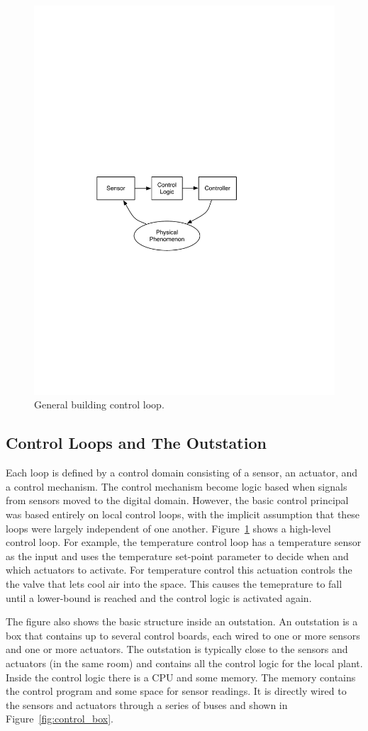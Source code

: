 \begin{figure}[t!] %
\centering
\includegraphics[width=0.50\columnwidth]{figs/control_loop}
\caption{General building control loop.}
\label{fig:control_loop}
\end{figure}

\subsection{Control Loops and The Outstation}
\label{sec:control_loops}
Each loop is defined by a control domain consisting of a sensor, an actuator, and a control mechanism.  The control mechanism
become logic based when signals from sensors moved to the digital domain.  However, the basic control principal was based
entirely on local control loops, with the implicit assumption that these loops were largely independent of one another.
Figure~\ref{fig:control_loop} shows a high-level control loop.  For example, the temperature control loop has a temperature
sensor as the input and uses the temperature set-point parameter to decide when and which actuators to activate.
For temperature control this actuation controls the the valve that lets cool air into the space.  This causes the temeprature
to fall until a lower-bound is reached and the control logic is activated again.

The figure also shows the basic structure inside an outstation.  An outstation is a box that contains up to several control boards, each
wired to one or more sensors and one or more actuators.  The outstation is typically close to the sensors and actuators (in the same room)
and contains all the control logic for the local plant.  Inside the control logic there is a CPU and some memory.  The memory
contains the control program and some space for sensor readings.  It is directly wired to the sensors and actuators through
a series of buses and shown in Figure~\ref{fig:control_box}.

